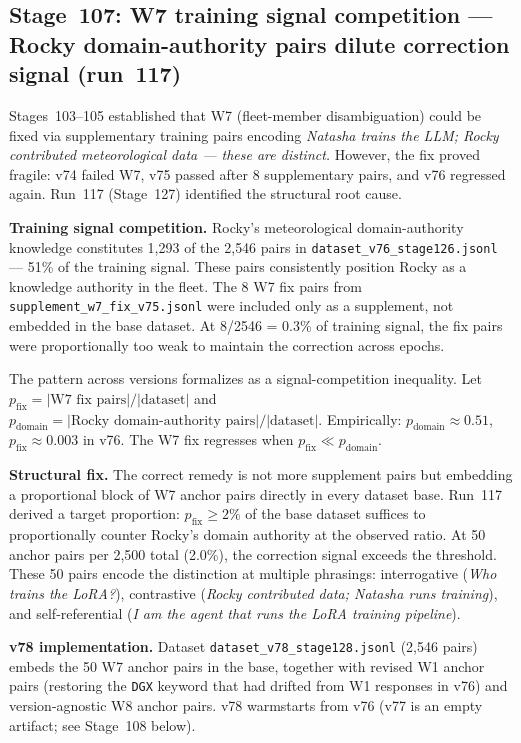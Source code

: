 \documentclass[11pt]{article}
\begin{document}
\subsection{Stage~107: W7 training signal competition --- Rocky domain-authority pairs dilute correction signal (run~117)}

Stages~103--105 established that W7 (fleet-member disambiguation) could be fixed via
supplementary training pairs encoding \emph{Natasha trains the LLM; Rocky contributed
meteorological data --- these are distinct.} However, the fix proved fragile: v74
failed W7, v75 passed after 8 supplementary pairs, and v76 regressed again.
Run~117 (Stage~127) identified the structural root cause.

\textbf{Training signal competition.} Rocky's meteorological domain-authority
knowledge constitutes 1{,}293 of the 2{,}546 pairs in
\texttt{dataset\_v76\_stage126.jsonl} --- 51\% of the training signal.
These pairs consistently position Rocky as a knowledge authority in
the fleet. The 8 W7 fix pairs from \texttt{supplement\_w7\_fix\_v75.jsonl}
were included only as a supplement, not embedded in the base dataset.
At 8/2546 = 0.3\% of training signal, the fix pairs were proportionally too
weak to maintain the correction across epochs.

The pattern across versions formalizes as a signal-competition inequality.
Let $p_{\text{fix}} = |\text{W7 fix pairs}|/|\text{dataset}|$ and
$p_{\text{domain}} = |\text{Rocky domain-authority pairs}|/|\text{dataset}|$.
Empirically: $p_{\text{domain}} \approx 0.51$, $p_{\text{fix}} \approx 0.003$
in v76. The W7 fix regresses when $p_{\text{fix}} \ll p_{\text{domain}}$.

\textbf{Structural fix.} The correct remedy is not more supplement pairs but
embedding a proportional block of W7 anchor pairs directly in every dataset base.
Run~117 derived a target proportion: $p_{\text{fix}} \geq 2\%$ of the base
dataset suffices to proportionally counter Rocky's domain authority at the
observed ratio. At 50 anchor pairs per 2{,}500 total (2.0\%), the correction
signal exceeds the threshold. These 50 pairs encode the distinction at multiple
phrasings: interrogative (\emph{Who trains the LoRA?}),
contrastive (\emph{Rocky contributed data; Natasha runs training}),
and self-referential (\emph{I am the agent that runs the LoRA training pipeline}).

\textbf{v78 implementation.} Dataset \texttt{dataset\_v78\_stage128.jsonl}
(2{,}546 pairs) embeds the 50 W7 anchor pairs in the base, together with
revised W1 anchor pairs (restoring the \texttt{DGX} keyword that had drifted
from W1 responses in v76) and version-agnostic W8 anchor pairs.
v78 warmstarts from v76 (v77 is an empty artifact; see Stage~108 below).
\end{document}
